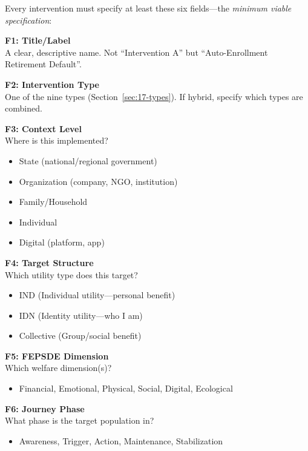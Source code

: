 Every intervention must specify at least these six fields---the \textit{minimum viable specification}:

\begin{tcolorbox}[colback=green!5!white, colframe=green!75!black,
    title=Light Mode: The Essential Six Fields]

\textbf{F1: Title/Label}\\
A clear, descriptive name. Not ``Intervention A'' but ``Auto-Enrollment Retirement Default''.

\textbf{F2: Intervention Type}\\
One of the nine types (Section~\ref{sec:17-types}). If hybrid, specify which types are combined.

\textbf{F3: Context Level}\\
Where is this implemented?
\begin{itemize}[nosep]
\item State (national/regional government)
\item Organization (company, NGO, institution)
\item Family/Household
\item Individual
\item Digital (platform, app)
\end{itemize}

\textbf{F4: Target Structure}\\
Which utility type does this target?
\begin{itemize}[nosep]
\item IND (Individual utility---personal benefit)
\item IDN (Identity utility---who I am)
\item Collective (Group/social benefit)
\end{itemize}

\textbf{F5: FEPSDE Dimension}\\
Which welfare dimension(s)?
\begin{itemize}[nosep]
\item Financial, Emotional, Physical, Social, Digital, Ecological
\end{itemize}

\textbf{F6: Journey Phase}\\
What phase is the target population in?
\begin{itemize}[nosep]
\item Awareness, Trigger, Action, Maintenance, Stabilization
\end{itemize}

\end{tcolorbox}

